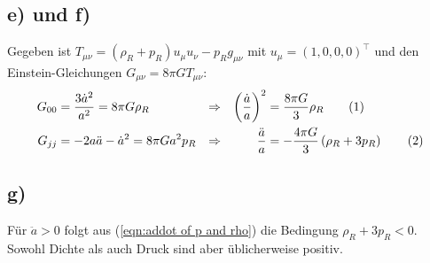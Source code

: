 \documentclass[a4paper,12pt]{article}
\newcommand\numberthis{\addtocounter{equation}{1}\tag{\theequation}}
\newcommand{\kla}{}
\begin{document}
\subsection*{e) und f)} Gegeben ist $T_{\mu\nu}=\kla\left( {\rho_R+p_R} \right)u_\mu u_\nu-p_Rg_{\mu\nu}$ mit $u_\mu=(1,0,0,0)^\top$ und den Einstein-Gleichungen $G_{\mu\nu}=8\pi GT_{\mu\nu}$:
\begin{align*}
G_{00}&=\frac{3\dot{a}^2}{a^2}=8\pi G\rho_R&\Rightarrow &&\kla\left( {\frac{\dot{a}}{a}} \right)^2&=\frac{8\pi G}{3}\rho_R\numberthis\label{eqn:adot of rho}\\
G_{jj}&=-2a\ddot{a}-\dot{a}^2=8\pi G a^2p_R&\Rightarrow &&\frac{\ddot{a}}{a}&=-\frac{4\pi G}{3}\kla\left( {\rho_R+3p_R} \right)\numberthis\label{eqn:addot of p and rho}
\end{align*}
\subsection*{g)}Für $\ddot{a}>0$ folgt aus (\ref{eqn:addot of p and rho}) die Bedingung $\rho_R+3 p_R<0$. Sowohl Dichte als auch Druck sind aber üblicherweise positiv.
\end{document}

